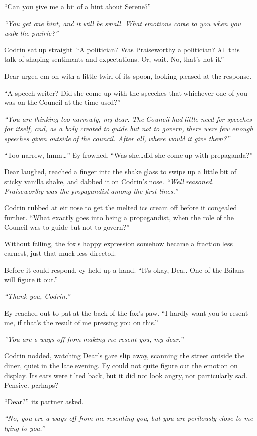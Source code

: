 ``Can you give me a bit of a hint about Serene?''

\emph{``You get one hint, and it will be small. What emotions come to you when you walk the prairie?''}

Codrin sat up straight. ``A politician? Was Praiseworthy a politician? All this talk of shaping sentiments and expectations. Or, wait. No, that's not it.''

Dear urged em on with a little twirl of its spoon, looking pleased at the response.

``A speech writer? Did she come up with the speeches that whichever one of you was on the Council at the time used?''

\emph{``You are thinking too narrowly, my dear. The Council had little need for speeches for itself, and, as a body created to guide but not to govern, there were few enough speeches given outside of the council. After all, where would it give them?''}

``Too narrow, hmm\ldots{}'' Ey frowned. ``Was she\ldots did she come up with propaganda?''

Dear laughed, reached a finger into the shake glass to swipe up a little bit of sticky vanilla shake, and dabbed it on Codrin's nose. \emph{``Well reasoned. Praiseworthy was the propagandist among the first lines.''}

Codrin rubbed at eir nose to get the melted ice cream off before it congealed further. ``What exactly goes into being a propagandist, when the role of the Council was to guide but not to govern?''

Without falling, the fox's happy expression somehow became a fraction less earnest, just that much less directed.

Before it could respond, ey held up a hand. ``It's okay, Dear. One of the Bălans will figure it out.''

\emph{``Thank you, Codrin.''}

Ey reached out to pat at the back of the fox's paw. ``I hardly want you to resent me, if that's the result of me pressing you on this.''

\emph{``You are a ways off from making me resent you, my dear.''}

Codrin nodded, watching Dear's gaze slip away, scanning the street outside the diner, quiet in the late evening. Ey could not quite figure out the emotion on display. Its ears were tilted back, but it did not look angry, nor particularly sad. Pensive, perhaps?

``Dear?'' its partner asked.

\emph{``No, you are a ways off from me resenting you, but you are perilously close to me lying to you.''}
